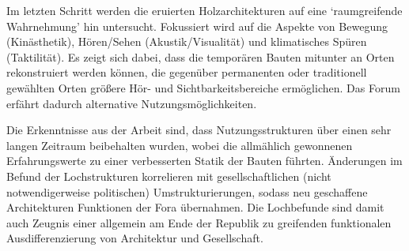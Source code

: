 Im letzten Schritt werden die eruierten Holzarchitekturen auf eine \enquote*{raumgreifende Wahrnehmung} hin untersucht.
Fokussiert wird auf die Aspekte von Bewegung (Kinästhetik), Hören/Sehen (Akustik/Visualität) und  klimatisches Spüren (Taktilität).
Es zeigt sich dabei, dass die temporären Bauten mitunter an Orten rekonstruiert werden können,
die gegenüber permanenten oder traditionell gewählten Orten größere Hör- und Sichtbarkeitsbereiche  ermöglichen.
Das Forum erfährt dadurch alternative Nutzungsmöglichkeiten.

Die Erkenntnisse aus der Arbeit sind, dass Nutzungsstrukturen über einen sehr langen Zeitraum beibehalten wurden,
wobei die allmählich gewonnenen Erfahrungswerte zu einer verbesserten Statik der Bauten führten.
Änderungen im Befund der Lochstrukturen korrelieren mit gesellschaftlichen (nicht notwendigerweise politischen) Umstrukturierungen,
sodass neu geschaffene Architekturen Funktionen der Fora übernahmen.
Die Lochbefunde sind damit auch Zeugnis einer allgemein am Ende der Republik zu greifenden funktionalen Ausdifferenzierung von Architektur und Gesellschaft.



